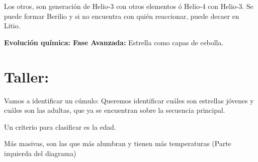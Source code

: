 \documentclass[11pt]{article}
\begin{document}
Los otros, son generación de Helio-3 con otros elementos ó Helio-4 con Helio-3. Se puede formar Berilio y si no encuentra con quién reaccionar, puede decaer en Litio.

\textbf{Evolución química: Fase Avanzada:} Estrella como capas de cebolla.
\section{Taller:}
\label{sec:orgea50d64}

Vamos a identificar un cúmulo: Queremos identificar cuáles son estrellas jóvenes y cuáles son las adultas, que ya se encuentran sobre la secuencia principal.


Un criterio para clasificar es la edad.

Más masivas, son las que más alumbran y tienen más temperaturas (Parte izquierda del diagrama)
\end{document}

